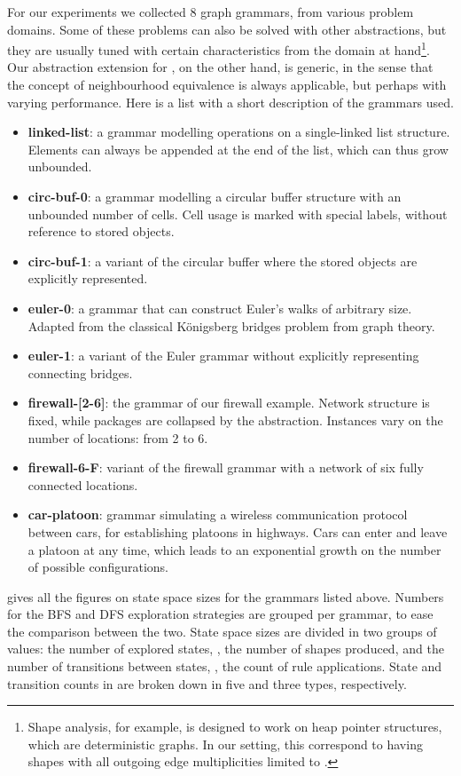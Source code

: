 For our experiments we collected 8 graph grammars, from various problem
domains. Some of these problems can also be solved with other abstractions, but
they are usually tuned with certain characteristics from the domain at
hand\footnote{Shape analysis, for example, is designed to work on heap pointer
structures, which are deterministic graphs. In our setting, this correspond to
having shapes with all outgoing edge multiplicities limited to .}. Our
abstraction extension for \GROOVE, on the other hand, is generic, in the sense
that the concept of neighbourhood equivalence is always applicable, but perhaps
with varying performance. Here is a list with a short description of the
grammars used.
\begin{itemize}
\item {\bf linked-list}: a grammar modelling operations on a single-linked
list structure. Elements can always be appended at the end of the list, which
can thus grow unbounded.
\item {\bf circ-buf-0}: a grammar modelling a circular buffer structure with
an unbounded number of cells. Cell usage is marked with special labels, without
reference to stored objects.
\item {\bf circ-buf-1}: a variant of the circular buffer where the stored
objects are explicitly represented.
\item {\bf euler-0}: a grammar that can construct Euler's walks of arbitrary
size. Adapted from the classical K\"onigsberg bridges problem from graph theory.
\item {\bf euler-1}: a variant of the Euler grammar without explicitly
representing connecting bridges.
\item {\bf firewall-[2-6]}: the grammar of our firewall example. Network
structure is fixed, while packages are collapsed by the abstraction. Instances
vary on the number of locations: from 2 to 6.
\item {\bf firewall-6-F}: variant of the firewall grammar with a network of six
fully connected locations.
\item {\bf car-platoon}: grammar simulating a wireless communication protocol
between cars, for establishing platoons in highways. Cars can enter and leave a
platoon at any time, which leads to an exponential growth on the number of
possible configurations.
\end{itemize}

 gives all the figures on state space sizes for the grammars listed
above. Numbers for the BFS and DFS exploration strategies are grouped per
grammar, to ease the comparison between the two. State space sizes are divided
in two groups of values: the number of explored states, \ie, the number of
shapes produced, and the number of transitions between states, \ie, the count of
rule applications. State and transition counts in  are broken down in
five and three types, respectively.

